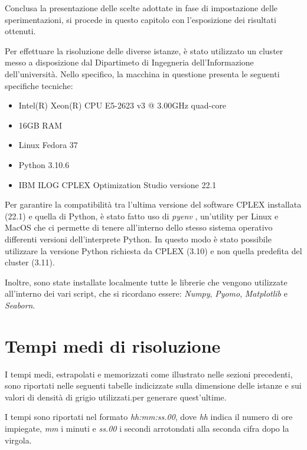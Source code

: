 Conclusa la presentazione delle scelte adottate in fase di impostazione delle sperimentazioni, 
si procede in questo capitolo con l'esposizione dei risultati ottenuti. 

Per effettuare la risoluzione delle diverse istanze, è stato utilizzato un cluster messo a disposizione dal Dipartimeto di Ingegneria dell'Informazione 
dell'università. Nello specifico, la macchina in questione presenta le seguenti specifiche tecniche:
\begin{itemize}
\item Intel(R) Xeon(R) CPU E5-2623 v3 @ 3.00GHz quad-core
\item 16GB RAM
\item Linux Fedora 37
\item Python 3.10.6
\item IBM ILOG CPLEX Optimization Studio versione 22.1
\end{itemize}
Per garantire la compatibilità tra l'ultima versione del software CPLEX installata (22.1) e quella di Python, è stato fatto uso di \textit{pyenv} \cite{pyenv}, 
un'utility per Linux e MacOS che ci permette di tenere all'interno dello stesso sistema operativo differenti versioni dell'interprete Python. In questo modo 
è stato possibile utilizzare la versione Python richiesta da CPLEX (3.10) e non quella predefita del cluster (3.11).

Inoltre, sono state installate localmente tutte le librerie che vengono utilizzate all'interno dei vari script, che si ricordano 
essere: \textit{Numpy}, \textit{Pyomo}, \textit{Matplotlib} e \textit{Seaborn}.

\newpage
\section{Tempi medi di risoluzione}
I tempi medi, estrapolati e memorizzati come illustrato nelle sezioni precedenti, sono riportati nelle seguenti tabelle indicizzate sulla dimensione delle istanze 
e sui valori di densità di grigio utilizzati.per generare quest'ultime.

I tempi sono riportati nel formato \textit{hh:mm:ss.00}, dove \textit{hh} indica il numero di ore impiegate, \textit{mm} i minuti e \textit{ss.00} i secondi arrotondati 
alla seconda cifra dopo la virgola. \\

